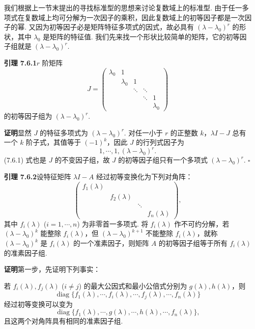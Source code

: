 \documentclass[UTF8,12pt,a4paper,fontset=fandol]{ctexart}
\begin{document}
我们根据上一节末提出的寻找标准型的思想来讨论复数域上的标准型. 由于任一多项式在复数域上均可分解为一次因子的乘积，因此复数域上的初等因子都是一次因子的幂. 又因为初等因子必是矩阵特征多项式的因式，故必具有 $(\lambda-\lambda_0)^r$ 的形状，其中 $\lambda_0$ 是矩阵的特征值. 我们先来找一个形状比较简单的矩阵，它的初等因子组就是 $(\lambda-\lambda_0)^r$.

\noindent\textbf{引理 7.6.1}\quad $r$ 阶矩阵
\[
J=\left(\begin{array}{ccccc}
\lambda_0 & 1 & & & \\
& \lambda_0 & 1 & & \\
& & \ddots & \ddots & \\
& & & \ddots & 1\\
& & & & \lambda_0
\end{array}\right)
\]
的初等因子组为 $(\lambda-\lambda_0)^r$.

\noindent\textbf{证明}\quad 显然 $J$ 的特征多项式为 $(\lambda-\lambda_0)^r$. 对任一小于 $r$ 的正整数 $k$，$\lambda I-J$ 总有一个 $k$ 阶子式，其值等于 $(-1)^k$，因此 $J$ 的行列式因子为
\begin{equation}
1,\cdots,1,(\lambda-\lambda_0)^r.
\tag{7.6.1}
\end{equation}
(7.6.1) 式也是 $J$ 的不变因子组，故 $J$ 的初等因子组只有一个多项式 $(\lambda-\lambda_0)^r$. $\square$

\noindent\textbf{引理 7.6.2}\quad 设特征矩阵 $\lambda I-A$ 经过初等变换化为下列对角阵：
\begin{equation}
\left(\begin{array}{cccc}
f_1(\lambda) & & & \\
& f_2(\lambda) & & \\
& & \ddots & \\
& & & f_n(\lambda)
\end{array}\right),
\tag{7.6.2}
\end{equation}
其中 $f_i(\lambda)$ ($i=1,\cdots,n$) 为非零首一多项式. 将 $f_i(\lambda)$ 作不可约分解，若 $(\lambda-\lambda_0)^k$ 能整除 $f_i(\lambda)$，但 $(\lambda-\lambda_0)^{k+1}$ 不能整除 $f_i(\lambda)$，就称 $(\lambda-\lambda_0)^k$ 是 $f_i(\lambda)$ 的一个准素因子，则矩阵 $A$ 的初等因子组等于所有 $f_i(\lambda)$ 的准素因子组.

\noindent\textbf{证明}\quad 第一步，先证明下列事实：

若 $f_i(\lambda),f_j(\lambda)$ ($i\neq j$) 的最大公因式和最小公倍式分别为 $g(\lambda),h(\lambda)$，则
\[
\operatorname{diag}\{f_1(\lambda),\cdots,f_i(\lambda),\cdots,f_j(\lambda),\cdots,f_n(\lambda)\}
\]
经过初等变换可以变为
\[
\operatorname{diag}\{f_1(\lambda),\cdots,g(\lambda),\cdots,h(\lambda),\cdots,f_n(\lambda)\},
\]
且这两个对角阵具有相同的准素因子组.
\end{document}
